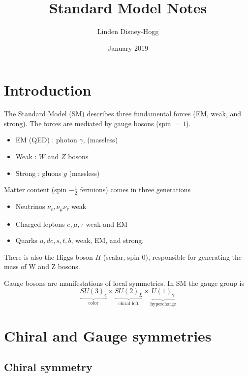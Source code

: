 \documentclass{article}
\title{Standard Model Notes}
\author{Linden Disney-Hogg}
\date{January 2019}
\begin{document}
\maketitle
\tableofcontents

\section{Introduction}
The Standard Model (SM) describes three fundamental forces (EM, weak, and strong). The forces are mediated by gauge bosons (spin $=1$).
\begin{itemize}
    \item EM (QED) : photon $\gamma$, (massless)
    \item Weak : $W$ and $Z$ bosons
    \item Strong : gluons $g$ (massless)
\end{itemize}
Matter content (spin $-\frac{1}{2}$ fermions) comes in three generations 
\begin{itemize}
    \item Neutrinos  $\nu_e, \nu_\mu \nu_\tau$ weak 
    \item Charged leptons $e, \mu, \tau$ weak and EM
    \item Quarks $u,d c,s,t,b$, weak, EM, and strong. 
\end{itemize}
There is also the Higgs boson $H$ (scalar, spin 0), responsible for generating the mass of W and Z bosons. 

Gauge bosons are manifestations of local symmetries. In SM the gauge group is 
\[
\underbrace{SU(3)_c}_{\text{color}} \times \underbrace{SU(2)_L}_{\text{chiral left}} \times \underbrace{U(1)_\gamma}_{\text{hypercharge}}
\]

\section{Chiral and Gauge symmetries}
\subsection{Chiral symmetry}
\end{document}
